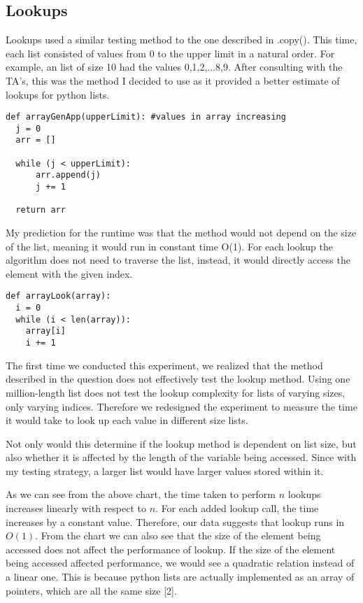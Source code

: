 \documentclass[12pt]{article}
\begin{document}
\subsection{Lookups}

Lookups used a similar testing method to the one described in .copy(). This time, each list consisted of values from 0 to the upper limit in a natural order. For example, an list of size 10 had the values 0,1,2,...8,9. After consulting with the TA's, this was the method I decided to use as it provided a better estimate of lookups for python lists.

\footnotesize
\begin{verbatim}
def arrayGenApp(upperLimit): #values in array increasing
  j = 0
  arr = []
  
  while (j < upperLimit):
      arr.append(j)
      j += 1

  return arr
\end{verbatim}
\normalsize

My prediction for the runtime was that the method would not depend on the size of the list, meaning it would run in constant time O(1). For each lookup the algorithm does not need to traverse the list, instead, it would directly access the element with the given index. 

\footnotesize
\begin{verbatim}
def arrayLook(array):
  i = 0
  while (i < len(array)): 
    array[i]
    i += 1
\end{verbatim}
\normalsize

The first time we conducted this experiment, we realized that the method described in the question does not effectively test the lookup method. Using one million-length list does not test the lookup complexity for lists of varying sizes, only varying indices. Therefore we redesigned the experiment to 
measure the time it would take to look up each value in different size lists. 

Not only would this determine if the lookup method is dependent on list size, but also whether it is affected by the length of the variable being accessed. Since with my testing strategy, a larger list would have larger values stored within it.



As we can see from the above chart, the time taken to perform $n$ lookups increases linearly with respect to $n$. For each added lookup call, the time increases by a constant value. Therefore, our data suggests that lookup runs in $O(1)$. From the chart we can also see that the size of the element being accessed does not affect the performance of lookup. If the size of the element being accessed affected performance, we would see a quadratic relation instead of a linear one. This is because python lists are actually implemented as an array of pointers, which are all the same size [2].
\end{document}

